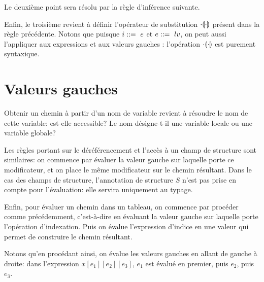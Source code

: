 
Le deuxième point sera résolu par la règle d'inférence suivante.

\begin{mathpar}
\end{mathpar}

%

Enfin, le troisième revient à définir l'opérateur de substitution
$\phxx{\ctxSub}$ présent dans la règle précédente. Notons que puisque $i
\gramisa e$ et $e \gramisa lv$, on peut aussi l'appliquer aux expressions et aux
valeurs gauches : l'opération $\phxx\ctxSub$ est purement syntaxique.

\section{Valeurs gauches}
\label{sec:eval-lv}

Obtenir un chemin à partir d'un nom de variable revient à résoudre le nom de
cette variable: est-elle accessible? Le nom désigne-t-il une variable locale
ou une variable globale?

\begin{mathpar}
\end{mathpar}

Les règles portant sur le déréférencement et l'accès à un champ de structure
sont similaires: on commence par évaluer la valeur gauche sur laquelle porte ce
modificateur, et on place le même modificateur sur le chemin résultant. Dans le
cas des champs de structure, l'annotation de structure $S$ n'est pas prise
en compte pour l'évaluation: elle servira uniquement au typage.

\begin{mathpar}
\end{mathpar}

Enfin, pour évaluer un chemin dans un tableau, on commence par procéder comme
précédemment, c'est-à-dire en évaluant la valeur gauche sur laquelle porte
l'opération d'indexation. Puis on évalue l'expression d'indice en une valeur qui
permet de construire le chemin résultant.

\begin{mathpar}
\end{mathpar}

Notons qu'en procédant ainsi, on évalue les valeurs gauches en allant de gauche
à droite: dans l'expression $x[e_1][e_2][e_3]$, $e_1$ est évalué en premier,
puis $e_2$, puis $e_3$.

